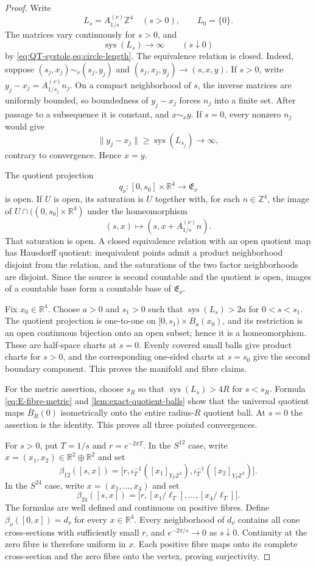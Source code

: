 \documentclass[11pt,letterpaper]{article}
\numberwithin{equation}{section}
\theoremstyle{definition}
\theoremstyle{remark}
\newcommand{\R}{\mathbb R}
\newcommand{\Z}{\mathbb Z}
\newcommand{\sys}{\operatorname{sys}}
\begin{document}
\begin{proof}
Write
\[
 L_s=A_{1/s}^{(\nu)}\Z^4\quad(s>0),\qquad L_0=\{0\}.
\]
The matrices vary continuously for \(s>0\), and
\[
 \sys(L_s)\longrightarrow\infty\qquad(s\downarrow0)
\]
by \cref{eq:QT-systole,eq:circle-length}.  The equivalence relation is
closed.  Indeed, suppose
\((s_j,x_j)\sim_\nu(s_j,y_j)\) and
\((s_j,x_j,y_j)\to(s,x,y)\).  If \(s>0\), write
\(y_j-x_j=A_{1/s_j}^{(\nu)}n_j\).  On a compact neighborhood of \(s\),
the inverse matrices are uniformly bounded, so boundedness of
\(y_j-x_j\) forces \(n_j\) into a finite set.  After passage to a
subsequence it is constant, and \(x\sim_\nu y\).  If \(s=0\), every
nonzero \(n_j\) would give
\[
 \|y_j-x_j\|\geq\sys(L_{s_j})\longrightarrow\infty,
\]
contrary to convergence.  Hence \(x=y\).

The quotient projection
\[
 q_\nu:[0,s_0]\times\R^4\longrightarrow\mathfrak E_\nu
\]
is open.  If \(U\) is open, its saturation is \(U\) together with, for
each \(n\in\Z^4\), the image of
\(U\cap((0,s_0]\times\R^4)\) under the homeomorphism
\[
 (s,x)\longmapsto(s,x+A_{1/s}^{(\nu)}n).
\]
That saturation is open.  A closed equivalence relation with an open
quotient map has Hausdorff quotient: inequivalent points admit a product
neighborhood disjoint from the relation, and the saturations of the two
factor neighborhoods are disjoint.  Since the source is second countable
and the quotient is open, images of a countable base form a countable
base of \(\mathfrak E_\nu\).

Fix \(x_0\in\R^4\).  Choose \(a>0\) and \(s_1>0\) such that
\(\sys(L_s)>2a\) for \(0<s<s_1\).  The quotient projection is one-to-one
on \([0,s_1)\times B_a(x_0)\), and its restriction is an open continuous
bijection onto an open subset; hence it is a homeomorphism.  These are
half-space charts at \(s=0\).  Evenly covered small balls give product
charts for \(s>0\), and the corresponding one-sided charts at \(s=s_0\)
give the second boundary component.  This proves the manifold and fibre
claims.

For the metric assertion, choose \(s_R\) so that
\(\sys(L_s)>4R\) for \(s<s_R\).  Formula
\cref{eq:E-fibre-metric} and \cref{lem:exact-quotient-balls} show that the
universal quotient maps \(\overline B_R(0)\) isometrically onto the entire
radius-\(R\) quotient ball.  At \(s=0\) the assertion is the identity.
This proves all three pointed convergences.

For \(s>0\), put \(T=1/s\) and \(r=e^{-2\pi T}\).  In the \(S^{12}\)
case, write \(x=(x_1,x_2)\in\R^2\oplus\R^2\) and set
\[
 \beta_{12}([s,x])
 =\bigl[r,\iota_T^{-1}([x_1]_{Y_T\Z^2}),
           \iota_T^{-1}([x_2]_{Y_T\Z^2})\bigr].
\]
In the \(S^{24}\) case, write \(x=(x_1,\ldots,x_4)\) and set
\[
 \beta_{24}([s,x])
 =\bigl[r,[x_1/\ell_T],\ldots,[x_4/\ell_T]\bigr].
\]
The formulas are well defined and continuous on positive fibres.  Define
\(\beta_\nu([0,x])=d_\nu\) for every \(x\in\R^4\).  Every neighborhood
of \(d_\nu\) contains all cone cross-sections with sufficiently small
\(r\), and \(e^{-2\pi/s}\to0\) as \(s\downarrow0\).  Continuity at the
zero fibre is therefore uniform in \(x\).  Each positive fibre maps onto
its complete cross-section and the zero fibre onto the vertex, proving
surjectivity.


\end{proof}
\end{document}
